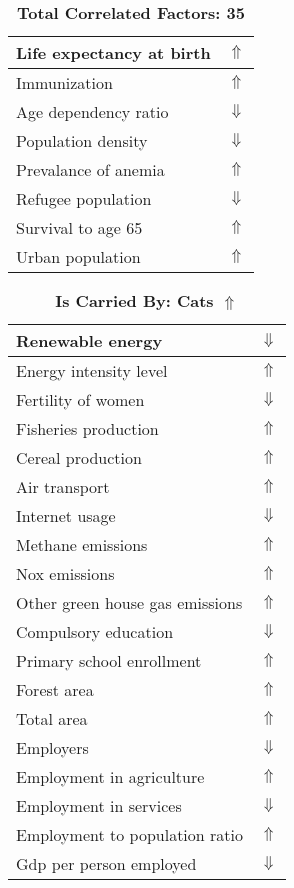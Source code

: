 \documentclass[12pt,notitlepage,oneside]{report}
\begin{document}
\begin{table}[!htb]
\begin{tabular}{|l|l|}
Life expectancy at birth & $\Uparrow$\\ \hline
Immunization & $\Uparrow$\\ \hline
Age dependency ratio & $\Downarrow$\\ \hline
Population density & $\Downarrow$\\ \hline
Prevalance of anemia & $\Uparrow$\\ \hline
Refugee population & $\Downarrow$\\ \hline
Survival to age 65 & $\Uparrow$\\ \hline
Urban population & $\Uparrow$\\ \hline
\end{tabular}
\caption*{\textbf{Total Correlated Factors: 35}}
\end{table}
\clearpage
\begin{table}[!htb]
\caption{\textbf{Is Carried By: Cats $\Uparrow$}}
\centering
\label{Correlated Socio-economic Factors0}
\begin{tabular}{|l|l|}
\hline
Renewable energy & $\Downarrow$\\ \hline
Energy intensity level & $\Uparrow$\\ \hline
Fertility of women & $\Downarrow$\\ \hline
Fisheries production & $\Uparrow$\\ \hline
Cereal production & $\Uparrow$\\ \hline
Air transport  & $\Uparrow$\\ \hline
Internet usage & $\Downarrow$\\ \hline
Methane emissions & $\Uparrow$\\ \hline
Nox emissions & $\Uparrow$\\ \hline
Other green house gas emissions & $\Uparrow$\\ \hline
Compulsory education & $\Downarrow$\\ \hline
Primary school enrollment & $\Uparrow$\\ \hline
Forest area & $\Uparrow$\\ \hline
Total area & $\Uparrow$\\ \hline
Employers & $\Downarrow$\\ \hline
Employment in agriculture & $\Uparrow$\\ \hline
Employment in services & $\Downarrow$\\ \hline
Employment to population ratio & $\Uparrow$\\ \hline
Gdp per person employed & $\Downarrow$\\ \hline

\end{tabular}
\end{table}
\end{document}

